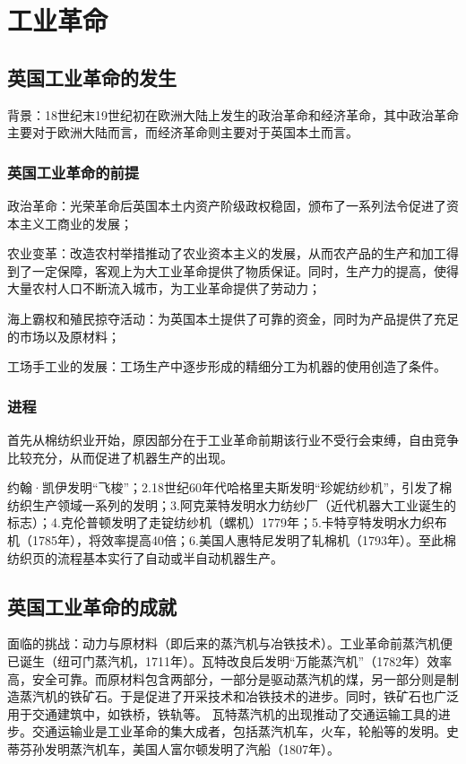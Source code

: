 \section{工业革命}

\subsection{英国工业革命的发生}
背景：18世纪末19世纪初在欧洲大陆上发生的政治革命和经济革命，其中政治革命主要对于欧洲大陆而言，而经济革命则主要对于英国本土而言。

\subsubsection{英国工业革命的前提}
政治革命：光荣革命后英国本土内资产阶级政权稳固，颁布了一系列法令促进了资本主义工商业的发展；

农业变革：改造农村举措推动了农业资本主义的发展，从而农产品的生产和加工得到了一定保障，客观上为大工业革命提供了物质保证。同时，生产力的提高，使得大量农村人口不断流入城市，为工业革命提供了劳动力；

海上霸权和殖民掠夺活动：为英国本土提供了可靠的资金，同时为产品提供了充足的市场以及原材料；

工场手工业的发展：工场生产中逐步形成的精细分工为机器的使用创造了条件。

\subsubsection{进程}
首先从棉纺织业开始，原因部分在于工业革命前期该行业不受行会束缚，自由竞争比较充分，从而促进了机器生产的出现。

约翰·凯伊发明“飞梭”；2.18世纪60年代哈格里夫斯发明“珍妮纺纱机”，引发了棉纺织生产领域一系列的发明；3.阿克莱特发明水力纺纱厂（近代机器大工业诞生的标志）；4.克伦普顿发明了走锭纺纱机（螺机）1779年；5.卡特亨特发明水力织布机（1785年），将效率提高40倍；6.美国人惠特尼发明了轧棉机（1793年）。至此棉纺织页的流程基本实行了自动或半自动机器生产。

\subsection{英国工业革命的成就}
面临的挑战：动力与原材料（即后来的蒸汽机与冶铁技术）。工业革命前蒸汽机便已诞生（纽可门蒸汽机，1711年）。瓦特改良后发明“万能蒸汽机”（1782年）效率高，安全可靠。而原材料包含两部分，一部分是驱动蒸汽机的煤，另一部分则是制造蒸汽机的铁矿石。于是促进了开采技术和冶铁技术的进步。同时，铁矿石也广泛用于交通建筑中，如铁桥，铁轨等。
瓦特蒸汽机的出现推动了交通运输工具的进步。交通运输业是工业革命的集大成者，包括蒸汽机车，火车，轮船等的发明。史蒂芬孙发明蒸汽机车，美国人富尔顿发明了汽船（1807年）。

